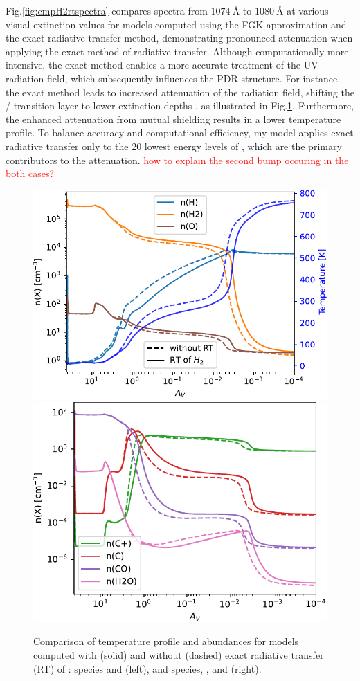 \documentclass[12pt,a4paper]{article}
\newcommand{\qt}[1]{\textcolor{red}{#1}}
\begin{document}
Fig.\ref{fig:cmpH2rtspectra} compares spectra from $1074~\text{\AA}$ to $1080~\text{\AA}$ at various visual extinction values for models computed using the FGK approximation and the exact radiative transfer method, demonstrating pronounced attenuation when applying the exact method of  radiative transfer. Although computationally more intensive, the exact method enables a more accurate treatment of the UV radiation field, which subsequently influences the PDR structure. For instance, the exact method leads to increased attenuation of the radiation field, shifting the / transition layer to lower extinction depths \parencite{Goicoechea2007}, as illustrated in Fig.\ref{fig:cmpH2rt}. Furthermore, the enhanced attenuation from mutual shielding results in a lower temperature profile. To balance accuracy and computational efficiency, my model applies exact radiative transfer only to the 20 lowest energy levels of , which are the primary contributors to the attenuation. \qt{how to explain the second bump occuring in the both cases?}

\begin{figure}[ht]
    \centering
    \includegraphics[width=.51\textwidth,keepaspectratio]{cmpH2rt_H_O.pdf}
    \includegraphics[width=.48\textwidth,keepaspectratio]{cmpH2rt_CO_H2O.pdf}
    \caption{Comparison of temperature profile and abundances for models computed with (solid) and without (dashed) exact radiative transfer (RT) of :  species and  (left), and  species, , and  (right). } \label{fig:cmpH2rt}
\end{figure}
\end{document}
